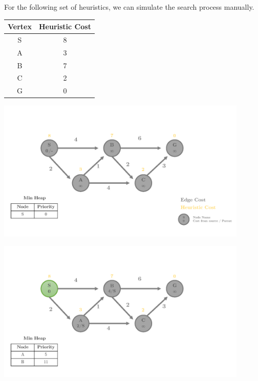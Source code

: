 \documentclass[12pt]{article}
\begin{document}
For the following set of heuristics, we can simulate the search process manually.

\begin{center}
  \begin{tabular}{|c|c|}
    \hline
    Vertex & Heuristic Cost\\
    \hline
    S & 8\\
    \hline
    A & 3\\
    \hline
    B & 7\\
    \hline
    C & 2\\
    \hline
    G & 0\\
    \hline
  \end{tabular}
\end{center}


\begin{center}
  \includegraphics[width=0.9\textwidth]{heuristic1_Page1.png}
\end{center}

\begin{center}
  \includegraphics[width=0.9\textwidth]{heuristic1_Page2.png}
\end{center}
\end{document}
